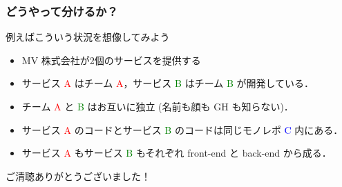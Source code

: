 \begin{frame}
    \frametitle{どうやって分けるか？}
    例えばこういう状況を想像してみよう
    \begin{itemize}
        \item<2-> MV 株式会社が2個のサービスを提供する
        \item<3-> サービス \textcolor{red}{A} はチーム \textcolor{red}{A}，サービス \textcolor{green}{B} はチーム \textcolor{green}{B} が開発している．
        \item<5-> チーム \textcolor{red}{A} と \textcolor{green}{B} はお互いに独立 (名前も顔も GH も知らない)．
        \item<6-> サービス \textcolor{red}{A} のコードとサービス \textcolor{green}{B} のコードは同じモノレポ \textcolor{blue}{C} 内にある．
        \item<7-> サービス \textcolor{red}{A} もサービス \textcolor{green}{B} もそれぞれ front-end と back-end から成る．
    \end{itemize}
\end{frame}

\begin{frame}
    \LARGE
    ご清聴ありがとうございました！
\end{frame}

\begin{frame}
    \LARGE
\end{frame}

